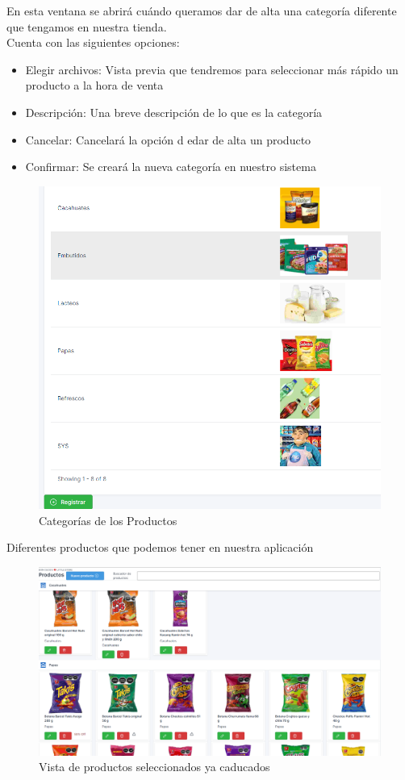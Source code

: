 \documentclass[a4paper,DIV=12]{scrreprt}
\begin{document}
	En esta ventana se abrirá cuándo queramos dar de alta una categoría diferente que tengamos en nuestra tienda.\\
	
	Cuenta con las siguientes opciones:\\
	\begin{itemize}
	\item Elegir archivos: Vista previa que tendremos para seleccionar más rápido un producto a la hora de venta
	\item Descripción: Una breve descripción de lo que es la categoría
	\item Cancelar: Cancelará la opción d edar de alta un producto
	\item Confirmar: Se creará la nueva categoría en nuestro sistema
	\end{itemize}
		\begin{figure}[!htb]
		\centering
		\includegraphics[scale=0.4]{CATEGORIAS.PNG}
		\caption{Categorías de los Productos}
	\end{figure}
	Diferentes productos que podemos tener en nuestra aplicación\\
	
		\begin{figure}[!htb]
		\centering
		\includegraphics[scale=0.4]{PRODUCTOS1.PNG}
		\caption{Vista de productos seleccionados ya caducados}
	\end{figure}
	
\end{document}
